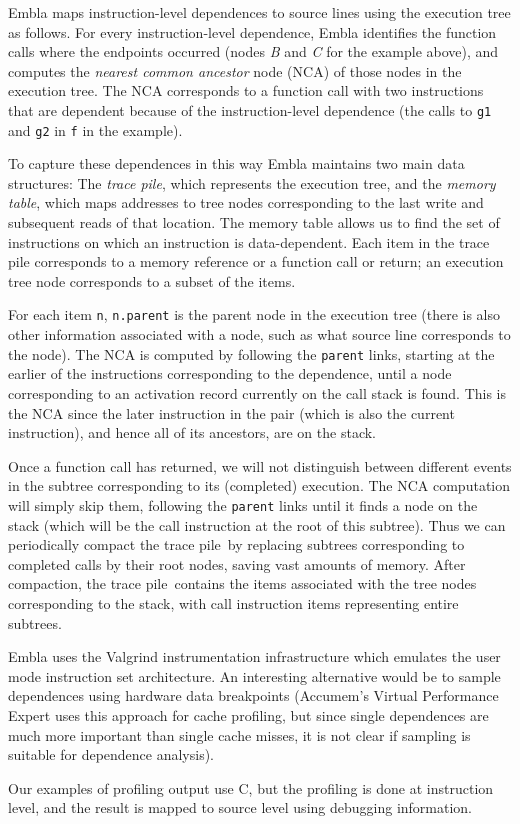 Embla maps instruction-level dependences to source lines
 using the execution tree as follows. For
every instruction-level dependence, Embla identifies the function calls
where the endpoints occurred (nodes {\it B} and {\it C} for the example
above), and computes the {\em nearest common ancestor} node (NCA) of
those nodes in the execution tree. The NCA corresponds to a function
call with two instructions that are dependent because of
the instruction-level dependence (the calls to {\tt g1} and {\tt g2} in 
{\tt f} in the example).

\newcommand{\tracepile}{trace pile}

To capture these dependences in this way
Embla maintains two main data structures: The {\em \tracepile}, which represents
the execution tree, and the {\em memory table}, which maps addresses to tree
nodes corresponding to the last write and subsequent reads of that
location. The memory table allows us to find the set of instructions
on which an instruction is data-dependent.
Each item in the trace pile corresponds to a memory reference 
or a function call or return; an execution tree node corresponds to
a subset of the items.

For each item {\tt n}, {\tt n.parent} is the parent node in the
execution tree (there is also other information associated with a
node, such as what source line corresponds to the node).  The NCA is
computed by following the {\tt parent} links, starting at the earlier
of the instructions corresponding to the dependence, until a node
corresponding to an activation record currently on the call stack is
found. This is the NCA since the later instruction in the pair (which
is also the current instruction), and hence all of its ancestors, are
on the stack.

Once a function call has returned, we will not distinguish between 
different events in the subtree corresponding to its (completed) 
execution. The NCA computation will simply skip them, following the 
{\tt parent} links until it finds a node on the stack (which will be
the call instruction at the root of this subtree). Thus we can 
periodically compact the \tracepile\ by replacing subtrees
corresponding to completed calls by their root nodes, saving vast amounts
of memory.
After compaction, the \tracepile\ contains the items associated with the
tree nodes corresponding to the stack, with call instruction items
representing entire subtrees.

Embla uses the Valgrind instrumentation infrastructure which emulates
the user mode instruction set architecture. An interesting alternative
would be to sample dependences using hardware data breakpoints
(Accumem's Virtual Performance Expert uses this approach for cache
profiling, but since single dependences are much more important than
single cache misses, it is not clear if sampling is suitable for
dependence analysis).

Our examples of profiling
output use C, but
the profiling is done at instruction level, and the result is
mapped to source level using debugging information.


